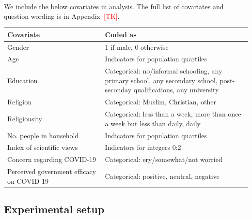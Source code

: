 \documentclass[letterpaper, 12pt, parskip=full,]{scrartcl}
\begin{document}
We include the below covariates in analysis. The full list of covariates and question wording is in Appendix~\textcolor{red}{[TK]}. 
\begin{table}[H]
\begin{tabular}{p{0.4\linewidth}p{0.6\linewidth}}
\textbf{Covariate}                   & \textbf{Coded as}                                     \\
\hline
Gender                      & 1   if male, 0 otherwise                     \\
Age                         & Indicators   for population quartiles        \\
Education                                   & Categorical: no/informal schooling, any   primary school, any secondary school, post-seconday qualifications, any   university \\
Religion                    & Categorical: Muslim, Christian, other                     \\
Religiousity                                & Categorical: less than a week, more than once   a week but less than daily, daily                                              \\
No.   people in household   & Indicators   for population quartiles        \\
Index   of scientific views & Indicators for integers 0:2                  \\
Concern regarding COVID-19  & Categorical: ery/somewhat/not worried \\
Perceived government efficacy   on COVID-19 & Categorical:  positive,   neutral, negative                                                                     
\end{tabular}
\end{table}


\subsection{Experimental setup}
\end{document}
